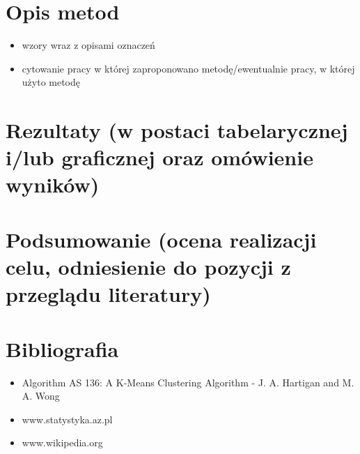 \documentclass{article}
\begin{document}
\section{Opis metod}
    \begin{itemize}
        \item wzory wraz z opisami oznaczeń
        \item cytowanie pracy w której zaproponowano metodę/ewentualnie pracy, w której użyto metodę
    \end{itemize}

\section{Rezultaty (w postaci tabelarycznej i/lub graficznej oraz omówienie wyników)}
\section{Podsumowanie (ocena realizacji celu, odniesienie do pozycji z przeglądu literatury)}
\section{Bibliografia}
    \begin{itemize}
        \item Algorithm AS 136: A K-Means Clustering Algorithm - J. A. Hartigan and M. A. Wong
        \item www.statystyka.az.pl
        \item www.wikipedia.org
    \end{itemize}
\end{document}
